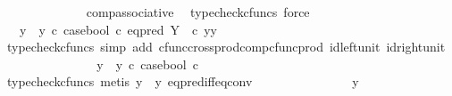 \begin{isabellebody}
\ \ \ \ \ \ \ \ \ \ \ \ \isamarkupfalse%
\ comp{\isacharunderscore}{\kern0pt}associative{}\ \isamarkupfalse%
\ {\isacharparenleft}{\kern0pt}typecheck{\isacharunderscore}{\kern0pt}cfuncs{\isacharcomma}{\kern0pt}\ force{\isacharparenright}{\kern0pt}\isanewline
\ \ \ \ \ \ \ \ \ \ \isamarkupfalse%
\ \isamarkupfalse%
\ {\isachardoublequoteopen}{\isachardot}{\kern0pt}{\isachardot}{\kern0pt}{\isachardot}{\kern0pt}\ {\isacharequal}{\kern0pt}\ {\isacharparenleft}{\kern0pt}y{}\ {\isasymamalg}\ y{}{\isacharparenright}{\kern0pt}\ {\isasymcirc}\isactrlsub c\ case{\isacharunderscore}{\kern0pt}bool\ {\isasymcirc}\isactrlsub c\ eq{\isacharunderscore}{\kern0pt}pred\ Y\ \ {\isasymcirc}\isactrlsub c\ {\isasymlangle}y{\isacharcomma}{\kern0pt}y{}{\isasymrangle}{\isachardoublequoteclose}\isanewline
\ \ \ \ \ \ \ \ \ \ \ \ \isamarkupfalse%
\ {\isacharparenleft}{\kern0pt}typecheck{\isacharunderscore}{\kern0pt}cfuncs{\isacharcomma}{\kern0pt}\ simp\ add{\isacharcolon}{\kern0pt}\ cfunc{\isacharunderscore}{\kern0pt}cross{\isacharunderscore}{\kern0pt}prod{\isacharunderscore}{\kern0pt}comp{\isacharunderscore}{\kern0pt}cfunc{\isacharunderscore}{\kern0pt}prod\ id{\isacharunderscore}{\kern0pt}left{\isacharunderscore}{\kern0pt}unit{}\ id{\isacharunderscore}{\kern0pt}right{\isacharunderscore}{\kern0pt}unit{}{\isacharparenright}{\kern0pt}\isanewline
\ \ \ \ \ \ \ \ \ \ \isamarkupfalse%
\ \isamarkupfalse%
\ {\isachardoublequoteopen}{\isachardot}{\kern0pt}{\isachardot}{\kern0pt}{\isachardot}{\kern0pt}\ {\isacharequal}{\kern0pt}\ {\isacharparenleft}{\kern0pt}y{}\ {\isasymamalg}\ y{}{\isacharparenright}{\kern0pt}\ {\isasymcirc}\isactrlsub c\ case{\isacharunderscore}{\kern0pt}bool\ {\isasymcirc}\isactrlsub c\ {\isasymf}{\isachardoublequoteclose}\isanewline
\ \ \ \ \ \ \ \ \ \ \ \ \isamarkupfalse%
\ {\isacharparenleft}{\kern0pt}typecheck{\isacharunderscore}{\kern0pt}cfuncs{\isacharcomma}{\kern0pt}\ metis\ {\isacartoucheopen}y\ {\isasymnoteq}\ y{}{\isacartoucheclose}\ eq{\isacharunderscore}{\kern0pt}pred{\isacharunderscore}{\kern0pt}iff{\isacharunderscore}{\kern0pt}eq{\isacharunderscore}{\kern0pt}conv{\isacharparenright}{\kern0pt}\isanewline
\ \ \ \ \ \ \ \ \ \ \isamarkupfalse%
\ \isamarkupfalse%
\ {\isachardoublequoteopen}{\isachardot}{\kern0pt}{\isachardot}{\kern0pt}{\isachardot}{\kern0pt}\ {\isacharequal}{\kern0pt}\ y{}{\isachardoublequoteclose}\isanewline

\end{isabellebody}
